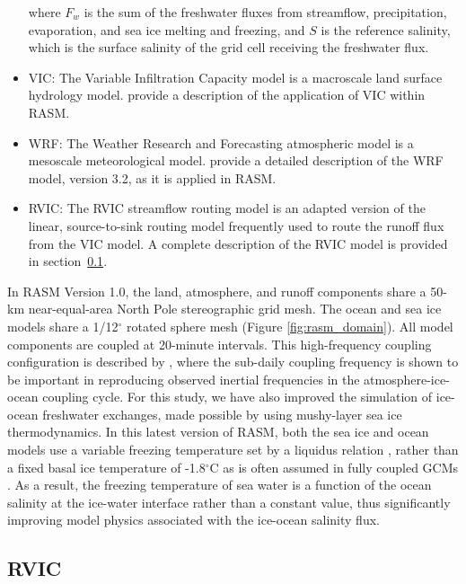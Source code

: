 \documentclass[jgrga, draft]{agutex}
\begin{document}
\begin{article}
\begin{itemize}[leftmargin=+.5in]
where $F_w$ is the sum of the freshwater fluxes from streamflow, precipitation, evaporation, and sea ice melting and freezing, and $S$ is the reference salinity, which is the surface salinity of the grid cell receiving the freshwater flux.

\item VIC: The Variable Infiltration Capacity model \citep{Liang_1994} is a macroscale land surface hydrology model.
\citet{Hamman_2016} provide a description of the application of VIC within RASM.
\item WRF: The Weather Research and Forecasting atmospheric model \citep{Skamarock_2007} is a mesoscale meteorological model.
\citet{DuVivier_2016} provide a detailed description of the WRF model, version 3.2, as it is applied in RASM.
\item RVIC: The RVIC streamflow routing model is an adapted version of the \citet{Lohmann_1996} linear, source-to-sink routing model frequently used to route the runoff flux from the VIC model.
A complete description of the RVIC model is provided in section~\ref{sec:rvic}.
\end{itemize}

In RASM Version 1.0, the land, atmosphere, and runoff components share a 50-km near-equal-area North Pole stereographic grid mesh.
The ocean and sea ice models share a 1/12$^{\circ}$ rotated sphere mesh (Figure \ref{fig:rasm_domain}).
All model components are coupled at 20-minute intervals.
This high-frequency coupling configuration is described by \citet{Roberts_2015a}, where the sub-daily coupling frequency is shown to be important in reproducing observed inertial frequencies in the atmosphere-ice-ocean coupling cycle.
For this study, we have also improved the simulation of ice-ocean freshwater exchanges, made possible by using mushy-layer sea ice thermodynamics.
In this latest version of RASM, both the sea ice and ocean models use a variable freezing temperature set by a liquidus relation \citep{Turner2015}, rather than a fixed basal ice temperature of -1.8$^\circ$C as is often assumed in fully coupled GCMs \citep [e.g.,][]{Jahn2012a}.
As a result, the freezing temperature of sea water is a function of the ocean salinity at the ice-water interface rather than a constant value, thus significantly improving model physics associated with the ice-ocean salinity flux.

\subsection{RVIC}
\label{sec:rvic}


\end{article}
\end{document}
